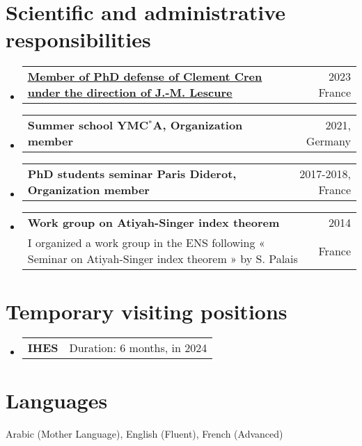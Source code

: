 \documentclass[A4,11pt]{article}
\makeatletter
\newcommand{\CVSubheading}[4]{
  \vspace{-2pt}\item
    \begin{tabular*}{0.97\textwidth}[t]{l@{\extracolsep{\fill}}r}
      \textbf{#1} & #2 \\
      \small#3 & \small #4 \\
    \end{tabular*}\vspace{-7pt}
}
\newcommand{\CVSubheadingshort}[2]{
  \vspace{-2pt}\item
    \begin{tabular*}{0.97\textwidth}[t]{l@{\extracolsep{\fill}}r}
      \textbf{#1} & #2 \\
    \end{tabular*}\vspace{-7pt}
}
\newcommand{\CVSubHeadingListStart}{\begin{itemize}[leftmargin=0.5cm, label={}]}
\newcommand{\CVSubHeadingListEnd}{\end{itemize}}
\makeatother
\begin{document}
\section{Scientific and administrative responsibilities}
 \CVSubHeadingListStart
 \CVSubheadingshort
      {\href{https://theses.fr/s279397}{\underline{Member of PhD defense of Clement Cren under the direction of J.-M. Lescure}}}{2023 France}
  \CVSubheadingshort
      {Summer school YMC$^*$A, Organization member}{2021, Germany}
      \CVSubheadingshort
      {PhD students seminar Paris Diderot, Organization member}{2017-2018, France}
          \CVSubheading
      {Work group on Atiyah-Singer index theorem}{2014}
      {I organized a work group in the ENS following « Seminar on Atiyah-Singer index theorem » by S. Palais}{France}
   \CVSubHeadingListEnd
\section{Temporary visiting positions}
   \CVSubHeadingListStart
   \CVSubheadingshort
        {IHES}{Duration: 6 months, in 2024}
     \CVSubHeadingListEnd


\section{Languages}
 \begin{itemize}[leftmargin=0.5cm, label={}]
    \small{\item{Arabic (Mother Language), English (Fluent), French (Advanced)}\let\thefootnote\relax{}}
 \end{itemize}
\end{document}
